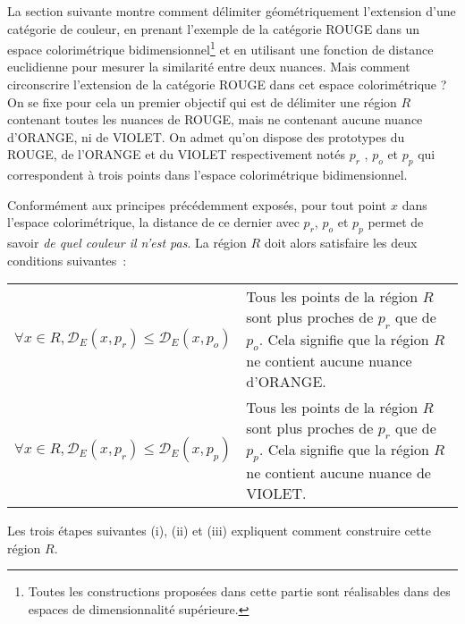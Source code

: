 \documentclass{article}
\begin{document}
La section suivante montre comment délimiter géométriquement l’extension d’une catégorie de couleur, en prenant l’exemple de la catégorie ROUGE dans un espace colorimétrique bidimensionnel\footnote{Toutes les constructions proposées dans cette partie sont réalisables dans des espaces de dimensionnalité supérieure.} et en utilisant une fonction de distance euclidienne pour mesurer la similarité entre deux nuances.
Mais comment circonscrire l’extension de la catégorie ROUGE dans cet espace colorimétrique ?
On se fixe pour cela un premier objectif qui est de délimiter une région $R$ contenant toutes les nuances de ROUGE, mais ne contenant aucune nuance d'ORANGE, ni de VIOLET. On admet qu’on dispose des prototypes du ROUGE, de l’ORANGE et du VIOLET respectivement notés \(p_r\) , \(p_o\) et \(p_p\) qui correspondent à trois points dans l’espace colorimétrique bidimensionnel. 

Conformément aux principes précédemment exposés, pour tout point \( x \) dans l'espace colorimétrique, la distance de ce dernier avec \(p_r\), \(p_o\) et \(p_p\) permet de savoir \textit{de quel couleur il n'est pas}. La région $R$ doit alors satisfaire les deux conditions suivantes~:

\noindent
\begin{tabularx}{\textwidth}{ 
    >{\centering\arraybackslash}m{} 
    X 
}
    
    \[ \forall x \in R, \mathcal{D}_E(x, p_r) \le \mathcal{D}_E(x, p_o) \]
    & 
    Tous les points de la région $R$ sont plus proches de $p_r$ que de $p_o$. Cela signifie que la région $R$ ne contient aucune nuance d'ORANGE.
    \\
    \[ \forall x \in R, \mathcal{D}_E(x, p_r) \le \mathcal{D}_E(x, p_p) \]
    & 
    Tous les points de la région $R$ sont plus proches de $p_r$ que de $p_p$.
    \vspace{0.5em} Cela signifie que la région $R$ ne contient aucune nuance de VIOLET.
    
    
\end{tabularx}

\bigskip

Les trois étapes suivantes (i), (ii) et (iii) expliquent comment construire cette région $R$.
\end{document}
